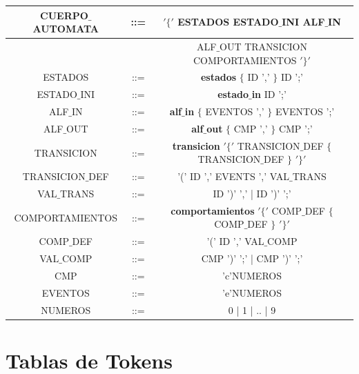 \documentclass[12pt,a4paper]{article}
\begin{document}
{\begin{center}
\begin{tabular}{|c|c|c|}
				CUERPO$\_$AUTOMATA	& ::= & $'\{'$ ESTADOS ESTADO$\_$INI ALF$\_$IN  \\ 
				\hline 
					&  & ALF$\_$OUT TRANSICION COMPORTAMIENTOS $'\}'$ \\ 
				\hline 
				ESTADOS	&  ::= &  \textbf{estados} $\{$ ID ',' $\}$ ID ';'\\ 
				\hline 
				 ESTADO$\_$INI &  ::= & \textbf{estado$\_$in} ID ';'\\ 
				\hline 
				ALF$\_$IN &  ::= & \textbf{alf$\_$in}  $\{$ EVENTOS ',' $\}$ EVENTOS ';' \\ 
				\hline
				ALF$\_$OUT &  ::= & \textbf{alf$\_$out}  $\{$ CMP ',' $\}$ CMP ';'  \\ 
				\hline 
				TRANSICION 	 &  ::= & \textbf{transicion} $'\{'$ TRANSICION$\_$DEF $\{$ TRANSICION$\_$DEF $\}$ $'\}'$ \\ 
				\hline 
				TRANSICION$\_$DEF	 &  ::= & '(' ID ',' EVENTS ',' VAL$\_$TRANS \\ 
				\hline 
				VAL$\_$TRANS &  ::= &  ID ')' ',' | ID ')' ';'\\ 
				\hline 
				COMPORTAMIENTOS	 &  ::= &  \textbf{comportamientos} $'\{'$ COMP$\_$DEF $\{$ COMP$\_$DEF $\}$ $'\}'$\\ 
				\hline 
				COMP$\_$DEF &  ::= & '(' ID ',' VAL$\_$COMP \\ 
				\hline 
				VAL$\_$COMP &  ::= &  CMP ')' ';' | CMP ')' ';' \\ 
				\hline 
				CMP  &  ::= & 'c'NUMEROS \\ 
				\hline 
				 EVENTOS &  ::= & 'e'NUMEROS \\ 
				 \hline 
				 NUMEROS &  ::= & 0 | 1 | .. | 9 \\ 
				 \hline 
				
			\end{tabular} 	
		\end{center}
	
	
	
	

	\newpage
	\section{Tablas de Tokens}
		
}
\end{document}
